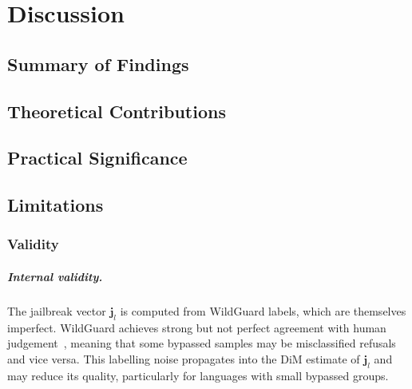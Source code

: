 \chapter{Discussion}
\label{chap:discussion}

\section{Summary of Findings}
\label{sec:summary}


\section{Theoretical Contributions}
\label{sec:theoretical}


\section{Practical Significance}
\label{sec:practical}


\section{Limitations}
\label{sec:limitations}

\subsection{Validity}

\paragraph{Internal validity.}
The jailbreak vector $\mathbf{j}_l$ is computed from WildGuard labels, which are themselves imperfect. WildGuard achieves strong but not perfect agreement with human judgement~\citep{han2024wildguard}, meaning that some bypassed samples may be misclassified refusals and vice versa. This labelling noise propagates into the DiM estimate of $\mathbf{j}_l$ and may reduce its quality, particularly for languages with small bypassed groups.

